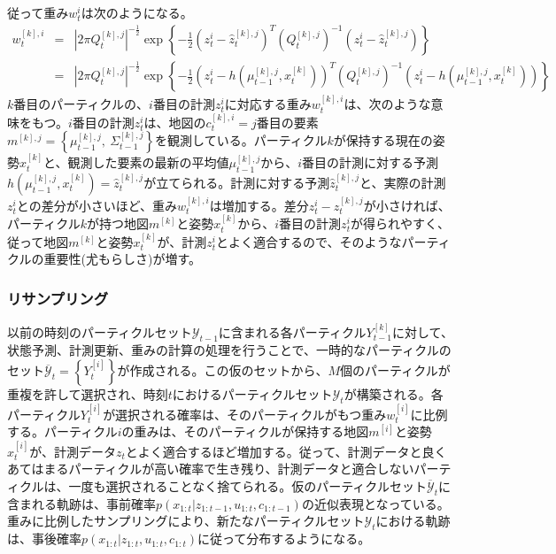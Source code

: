 \documentclass[dvipdfmx,a4paper]{jsarticle}
\begin{document}
従って重み$w_t^i$は次のようになる。
\begin{eqnarray}
	w_t^{[k], i} &=& \left| 2 \pi Q_t^{[k], j} \right|^{-\frac{1}{2}} \exp \left\{ -\frac{1}{2} \left( z_t^i - \widehat{z}_t^{[k], j} \right)^T \left( Q_t^{[k], j} \right)^{-1} \left( z_t^i - \widehat{z}_t^{[k], j} \right) \right\} \\
	&=& \left| 2 \pi Q_t^{[k], j} \right|^{-\frac{1}{2}} \exp \left\{ -\frac{1}{2} \left( z_t^i - h(\mu_{t - 1}^{[k], j}, x_t^{[k]}) \right)^T \left( Q_t^{[k], j} \right)^{-1} \left( z_t^i - h(\mu_{t - 1}^{[k], j}, x_t^{[k]}) \right) \right\}
\end{eqnarray}
$k$番目のパーティクルの、$i$番目の計測$z_t^i$に対応する重み$w_t^{[k], i}$は、次のような意味をもつ。$i$番目の計測$z_t^i$は、地図の$c_t^{[k], i} = j$番目の要素$m^{[k], j} = \left\{ \mu_{t - 1}^{[k], j}, \ \Sigma_{t - 1}^{[k], j} \right\}$を観測している。パーティクル$k$が保持する現在の姿勢$x_t^{[k]}$と、観測した要素の最新の平均値$\mu_{t - 1}^{[k], j}$から、$i$番目の計測に対する予測$h(\mu_{t - 1}^{[k], j}, x_t^{[k]}) = \widehat{z}_t^{[k], j}$が立てられる。計測に対する予測$\widehat{z}_t^{[k], j}$と、実際の計測$z_t^i$との差分が小さいほど、重み$w_t^{[k], i}$は増加する。差分$z_t^i - \widehat{z}_t^{[k], j}$が小さければ、パーティクル$k$が持つ地図$m^{[k]}$と姿勢$x_t^{[k]}$から、$i$番目の計測$z_t^i$が得られやすく、従って地図$m^{[k]}$と姿勢$x_t^{[k]}$が、計測$z_t^i$とよく適合するので、そのようなパーティクルの重要性(尤もらしさ)が増す。

\subsubsection{リサンプリング}
以前の時刻のパーティクルセット$\mathcal{Y}_{t - 1}$に含まれる各パーティクル$Y_{t - 1}^{[k]}$に対して、状態予測、計測更新、重みの計算の処理を行うことで、一時的なパーティクルのセット$\overline{\mathcal{Y}}_t = \left\{ Y_t^{[i]} \right\}$が作成される。この仮のセットから、$M$個のパーティクルが重複を許して選択され、時刻$t$におけるパーティクルセット$\mathcal{Y}_t$が構築される。各パーティクル$Y_t^{[i]}$が選択される確率は、そのパーティクルがもつ重み$w_t^{[i]}$に比例する。パーティクル$i$の重みは、そのパーティクルが保持する地図$m^{[i]}$と姿勢$x_t^{[i]}$が、計測データ$z_t$とよく適合するほど増加する。従って、計測データと良くあてはまるパーティクルが高い確率で生き残り、計測データと適合しないパーティクルは、一度も選択されることなく捨てられる。仮のパーティクルセット$\overline{\mathcal{Y}}_t$に含まれる軌跡は、事前確率$p(x_{1 : t} | z_{1 : t - 1}, u_{1 : t}, c_{1 : t - 1})$の近似表現となっている。重みに比例したサンプリングにより、新たなパーティクルセット$\mathcal{Y}_t$における軌跡は、事後確率$p(x_{1 : t} | z_{1 : t}, u_{1 : t}, c_{1 : t})$に従って分布するようになる。
\end{document}
